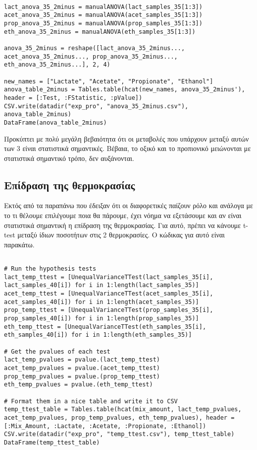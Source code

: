 \documentclass[11pt]{article}
\begin{document}
\begin{verbatim}

lact_anova_35_2minus = manualANOVA(lact_samples_35[1:3])
acet_anova_35_2minus = manualANOVA(acet_samples_35[1:3])
prop_anova_35_2minus = manualANOVA(prop_samples_35[1:3])
eth_anova_35_2minus = manualANOVA(eth_samples_35[1:3])

anova_35_2minus = reshape([lact_anova_35_2minus..., acet_anova_35_2minus..., prop_anova_35_2minus..., eth_anova_35_2minus...], 2, 4)

new_names = ["Lactate", "Acetate", "Propionate", "Ethanol"]
anova_table_2minus = Tables.table(hcat(new_names, anova_35_2minus'), header = [:Test, :FStatistic, :pValue])
CSV.write(datadir("exp_pro", "anova_35_2minus.csv"), anova_table_2minus)
DataFrame(anova_table_2minus)
\end{verbatim}

Προκύπτει με πολύ μεγάλη βεβαιότητα ότι οι μεταβολές που υπάρχουν μεταξύ αυτών των 3 είναι στατιστικά σημαντικές. Βέβαια, το οξικό και το προπιονικό μειώνονται με στατιστικά σημαντικό τρόπο, δεν αυξάνονται.

\subsection{Επίδραση της θερμοκρασίας}
\label{sec:org7533071}
Εκτός από τα παραπάνω που έδειξαν ότι οι διαφορετικές παίζουν ρόλο και ανάλογα με το τι θέλουμε επιλέγουμε ποια θα πάρουμε, έχει νόημα να εξετάσουμε και αν είναι στατιστικά σημαντική η επίδραση της θερμοκρασίας. Για αυτό, πρέπει να κάνουμε t-test μεταξύ ίδιων ποσοτήτων στις 2 θερμοκρασίες. Ο κώδικας για αυτό είναι παρακάτω.

\begin{verbatim}

# Run the hypothesis tests
lact_temp_ttest = [UnequalVarianceTTest(lact_samples_35[i], lact_samples_40[i]) for i in 1:length(lact_samples_35)]
acet_temp_ttest = [UnequalVarianceTTest(acet_samples_35[i], acet_samples_40[i]) for i in 1:length(acet_samples_35)]
prop_temp_ttest = [UnequalVarianceTTest(prop_samples_35[i], prop_samples_40[i]) for i in 1:length(prop_samples_35)]
eth_temp_ttest = [UnequalVarianceTTest(eth_samples_35[i], eth_samples_40[i]) for i in 1:length(eth_samples_35)]

# Get the pvalues of each test
lact_temp_pvalues = pvalue.(lact_temp_ttest)
acet_temp_pvalues = pvalue.(acet_temp_ttest)
prop_temp_pvalues = pvalue.(prop_temp_ttest)
eth_temp_pvalues = pvalue.(eth_temp_ttest)

# Format them in a nice table and write it to CSV
temp_ttest_table = Tables.table(hcat(mix_amount, lact_temp_pvalues, acet_temp_pvalues, prop_temp_pvalues, eth_temp_pvalues), header = [:Mix_Amount, :Lactate, :Acetate, :Propionate, :Ethanol])
CSV.write(datadir("exp_pro", "temp_ttest.csv"), temp_ttest_table)
DataFrame(temp_ttest_table)
\end{verbatim}
\end{document}
